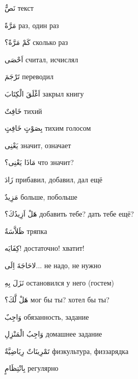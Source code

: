 \documentclass[a5paper]{article}
\newcommand\textstyleDropCaps[1]{#1}
\newcommand\textstyleCaptioncharacters[1]{#1}
\begin{document}
\textstyleCaptioncharacters{نَصٌّ }\textstyleDropCaps{текст‎}

\textstyleCaptioncharacters{مَرَّةً }\textstyleDropCaps{раз, один раз‎}

\textstyleCaptioncharacters{كَمْ مَرَّةً؟ }\textstyleDropCaps{сколько раз‎}

\textstyleCaptioncharacters{اَحْصَى }\textstyleDropCaps{считал, исчислял‎}

\textstyleCaptioncharacters{تَرْجَمَ }\textstyleDropCaps{переводил‎}

\textstyleCaptioncharacters{اَغْلَقَ الْكِتَابَ }\textstyleDropCaps{закрыл книгу‎}

\textstyleCaptioncharacters{خَافِتٌ }\textstyleDropCaps{тихий‎}

\textstyleCaptioncharacters{بِصَوْتٍ خَافِتٍ }\textstyleDropCaps{тихим го­лосом‎}

\textstyleCaptioncharacters{يَعْنِى }\textstyleDropCaps{значит, означает‎}

\textstyleCaptioncharacters{مَاذَا يَعْنِى؟ }\textstyleDropCaps{что значит?‎}

\textstyleCaptioncharacters{زَادَ }\textstyleDropCaps{прибавил, добавил, дал ещё‎}

\textstyleCaptioncharacters{مَزِيدٌ }\textstyleDropCaps{больше, побольше‎}

\textstyleCaptioncharacters{هَلْ اَزِيدُكَ؟ }\textstyleDropCaps{добавить тебе? дать тебе ещё?‎}

\textstyleCaptioncharacters{ظَلاَّسَةٌ }\textstyleDropCaps{тряпка‎}

\textstyleCaptioncharacters{كِفَايَه! }\textstyleDropCaps{достаточно! хва­тит!‎}

\textstyleCaptioncharacters{لاحَاجَةَ اِلَى...ِ }\textstyleDropCaps{не надо, не нужно‎}

\textstyleCaptioncharacters{نَزَلَ بِهِ }\textstyleDropCaps{остановился у него (гостем)‎}

\textstyleCaptioncharacters{هَلْ لَّكَ؟ }\textstyleDropCaps{мог бы ты? хо­тел бы ты?‎}

\textstyleCaptioncharacters{وَاجِبٌ }\textstyleDropCaps{обязанность, зада­ние‎}

\textstyleCaptioncharacters{وَاجِبُ الْمَنْزِلِ }\textstyleDropCaps{домаш­нее задание‎}

\textstyleCaptioncharacters{تَمْرِينَاتٌ رِيَاضِيَّةٌ }\textstyleDropCaps{физ­культура, физзарядка‎}

\textstyleCaptioncharacters{بِانْتِظَامٍ }\textstyleDropCaps{регулярно‎}
\end{document}
